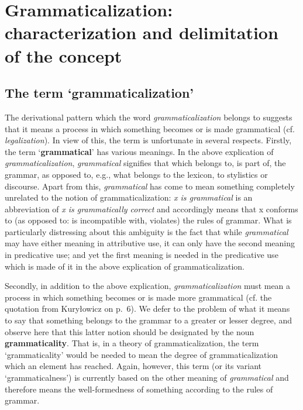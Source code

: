 \chapter{Grammaticalization: characterization and delimitation of the concept}

\section{The term ‘grammaticalization’}

The derivational pattern which the word \textit{grammaticalization} belongs to suggests that it means a process in which something becomes or is made grammatical (cf. \textit{legalization}). In view of this, the term is unfortunate in several respects. Firstly, the term ‘\textbf{grammatical}’ has various meanings. In the above explication of \textit{grammaticalization}, \textit{grammatical} signifies that which belongs to, is part of, the grammar, as opposed to, e.g., what belongs to the lexicon, to stylistics or discourse. Apart from this, \textit{grammatical} has come to mean something completely unrelated to the notion of grammaticalization: \textit{x is grammatical} is an abbreviation of \textit{x is grammatically correct} and accordingly means that x conforms to (as opposed to: is incompatible with, violates) the rules of grammar. What is particularly distressing about this ambiguity is the fact that while \textit{grammatical} may have either meaning in attributive use, it can only have the second meaning in predicative use; and yet the first meaning is needed in the predicative use which is made of it in the above explication of grammaticalization.

Secondly, in addition to the above explication, \textit{grammaticalization} must mean a process in which something becomes or is made  more grammatical (cf. the quotation from Kuryłowicz on p.~6). We defer to  the problem of what it means to say that something belongs to the grammar to a greater or lesser degree, and observe here that this latter notion should be designated by the noun \textbf{grammaticality}. That is, in a theory of grammaticalization, the term ‘grammaticality’ would be needed to mean the degree of grammaticalization which an element has reached. Again, however, this term (or its variant ‘grammaticalness’) is currently based on the other meaning of \textit{grammatical} and therefore means the well-formedness of something according to the rules of grammar.

